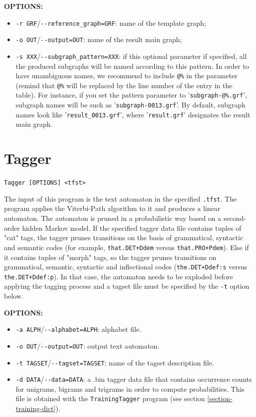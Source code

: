 \bigskip
\noindent \textbf{OPTIONS:}
\begin{itemize}
  \item \verb+-r GRF+/\verb+--reference_graph=GRF+: name of the template graph;
  
  \item \verb+-o OUT+/\verb+--output=OUT+: name of the result main graph;
  
  \item \verb+-s XXX+/\verb+--subgraph_pattern=XXX+: if this optional parameter
  if specified, all the produced subgraphs will be named according to this pattern. 
  In order to have unambiguous names, we recommend to include \verb+@%+ in the parameter 
  (remind that \verb+@%+ will be replaced by the line number of the entry in the table). 
  For instance, if you set the pattern parameter to '\verb+subgraph-@%.grf+', 
  subgraph names will be such as '\verb+subgraph-0013.grf+'. By default,
  subgraph names look like '\verb+result_0013.grf+', where '\verb+result.grf+' 
  designates the result main graph.
\end{itemize}






\section{Tagger}
\verb+Tagger [OPTIONS] <tfst>+
\label{section-Tagger}

\bigskip
\noindent The input of this program is the text automaton in the specified \verb+.tfst+. The program applies
the Viterbi-Path algorithm to it and produces a linear automaton. The automaton is pruned in a probabilistic way based on
a second-order hidden Markov model. If the specified tagger data file contains tuples of "cat" tags,
the tagger prunes transitions on the basis of grammatical, syntactic and semantic codes (for example, \verb$that.DET+Ddem$ versus 
\verb$that.PRO+Pdem$). Else if it contains tuples of "morph" tags, so the tagger prunes transitions on grammatical, semantic,
syntactic and inflectional codes (\verb$the.DET+Ddef:s$ versus \verb$the.DET+Ddef:p$). In that case, the automaton needs to be 
exploded before applying the tagging process and a tagset file must be specified by the \verb+-t+ option below.

\bigskip
\noindent \textbf{OPTIONS:}
\begin{itemize}
  \item \verb+-a ALPH+/\verb+--alphabet=ALPH+: alphabet file.
  \item \verb+-o OUT+/\verb+--output=OUT+: output text automaton.
  \item \verb+-t TAGSET+/\verb+--tagset=TAGSET+: name of the tagset description file.
  \item \verb+-d DATA+/\verb+--data=DATA+: a .bin tagger data file that contains occurrence counts 
  for unigrams, bigrams and trigrams in order to compute probabilities. This file is obtained with 
  the \verb+TrainingTagger+ program (see section \ref{section-training-dict}).
\end{itemize}





